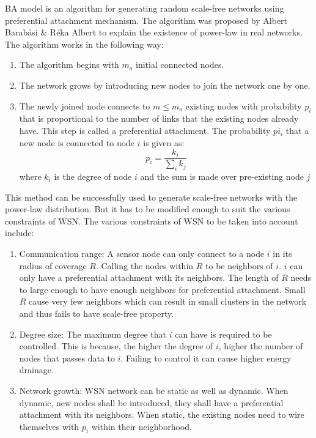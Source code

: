 \documentclass{article}
\begin{document}
	BA model is an algorithm for generating random scale-free networks using preferential attachment mechanism. The algorithm was proposed by Albert Barab{\'a}si \& R{\'e}ka Albert to explain the existence of power-law in real networks. The algorithm works in the following way:
	\begin{enumerate}
		\item The algorithm begins with $m_o$ initial connected nodes.
		\item The network grows by introducing new nodes to join the network one by one. 
		\item The newly joined node connects to $m \leq m_o$ existing nodes with probability $p_i$ that is proportional to the number of links that the existing nodes already have. This step is called a preferential attachment. The probability $pi_i$ that a new node is connected to node $i$ is given as:
		\begin{equation}
		p_i = \frac{k_i}{\sum_i{k_j}}
		\end{equation}
		where $k_i$ is the degree of node $i$ and the sum is made over pre-existing node $j$
	\end{enumerate}
	This method can be successfully used to generate scale-free networks with the power-law distribution. But it has to be modified enough to suit the various constraints of WSN. The various constraints of WSN to be taken into account include: 
	\begin{enumerate}
		\item Communication range: A sensor node can only connect to a node $i$ in its radius of coverage $R$. Calling the nodes within $R$ to be neighbors of $i$. $i$ can only have a preferential attachment with its neighbors. The length of $R$ needs to large enough to have enough neighbors for preferential attachment. Small $R$ cause very few neighbors which can result in small clusters in the network and thus fails to have scale-free property.
		\item Degree size: The maximum degree that $i$ can have is required to be controlled. This is because, the higher the degree of $i$, higher the number of nodes that passes data to $i$. Failing to control it can cause higher energy drainage. 
		\item Network growth: WSN network can be static as well as dynamic. When dynamic, new nodes shall be introduced, they shall have a preferential attachment with its neighbors. When static, the existing nodes need to wire themselves with $p_i$ within their neighborhood.
	\end{enumerate}
	
\end{document}
